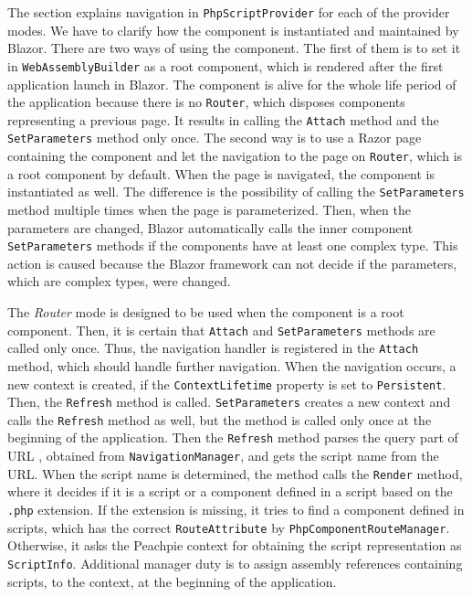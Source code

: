 The section explains navigation in \texttt{PhpScriptProvider} for each of the provider modes.
We have to clarify how the component is instantiated and maintained by Blazor.
There are two ways of using the component.
The first of them is to set it in \texttt{WebAssemblyBuilder} as a root component,
which is rendered after the first application launch in Blazor.
The component is alive for the whole life period of the application because there is no \texttt{Router}, which disposes components representing a previous page. 
It results in calling the \texttt{Attach} method and the \texttt{SetParameters} method only once.
The second way is to use a Razor page containing the component and let the navigation to the page on \texttt{Router}, which is a root component by default.
When the page is navigated, the component is instantiated as well.
The difference is the possibility of calling the \texttt{SetParameters} method multiple times when the page is parameterized.
Then, when the parameters are changed, Blazor automatically calls the inner component \texttt{SetParameters} methods if the components have at least one complex type. 
This action is caused because the Blazor framework can not decide if the parameters, which are complex types, were changed.
\par
The \textit{Router} mode is designed to be used when the component is a root component.
Then, it is certain that \texttt{Attach} and \texttt{SetParameters} methods are called only once.
Thus, the navigation handler is registered in the \texttt{Attach} method, which should handle further navigation.
When the navigation occurs, a new context is created, if the \texttt{ContextLifetime} property is set to \texttt{Persistent}.
Then, the \texttt{Refresh} method is called.
\texttt{SetParameters} creates a new context and calls the \texttt{Refresh} method as well, but the method is called only once at the beginning of the application.
Then the \texttt{Refresh} method parses the query part of URL \cite{online:querryStrings}, obtained from \texttt{NavigationManager}, and gets the script name from the URL.
When the script name is determined, the method calls the \texttt{Render} method, where it decides if it is a script or a component defined in a script based on the \texttt{.php} extension.
If the extension is missing, it tries to find a component defined in scripts, which has the correct \texttt{RouteAttribute} by \texttt{PhpComponentRouteManager}.
Otherwise, it asks the Peachpie context for obtaining the script representation as \texttt{ScriptInfo}.
Additional manager duty is to assign assembly references containing scripts, to the context, at the beginning of the application.
